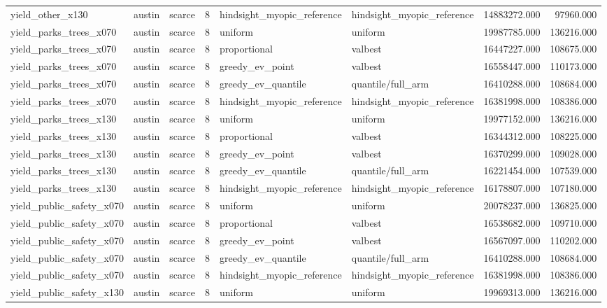 \begin{tabular}{lllrllrr}
yield\_other\_x130 & austin & scarce & 8 & hindsight\_myopic\_reference & hindsight\_myopic\_reference & 14883272.000 & 97960.000 \\
yield\_parks\_trees\_x070 & austin & scarce & 8 & uniform & uniform & 19987785.000 & 136216.000 \\
yield\_parks\_trees\_x070 & austin & scarce & 8 & proportional & valbest & 16447227.000 & 108675.000 \\
yield\_parks\_trees\_x070 & austin & scarce & 8 & greedy\_ev\_point & valbest & 16558447.000 & 110173.000 \\
yield\_parks\_trees\_x070 & austin & scarce & 8 & greedy\_ev\_quantile & quantile/full\_arm & 16410288.000 & 108684.000 \\
yield\_parks\_trees\_x070 & austin & scarce & 8 & hindsight\_myopic\_reference & hindsight\_myopic\_reference & 16381998.000 & 108386.000 \\
yield\_parks\_trees\_x130 & austin & scarce & 8 & uniform & uniform & 19977152.000 & 136216.000 \\
yield\_parks\_trees\_x130 & austin & scarce & 8 & proportional & valbest & 16344312.000 & 108225.000 \\
yield\_parks\_trees\_x130 & austin & scarce & 8 & greedy\_ev\_point & valbest & 16370299.000 & 109028.000 \\
yield\_parks\_trees\_x130 & austin & scarce & 8 & greedy\_ev\_quantile & quantile/full\_arm & 16221454.000 & 107539.000 \\
yield\_parks\_trees\_x130 & austin & scarce & 8 & hindsight\_myopic\_reference & hindsight\_myopic\_reference & 16178807.000 & 107180.000 \\
yield\_public\_safety\_x070 & austin & scarce & 8 & uniform & uniform & 20078237.000 & 136825.000 \\
yield\_public\_safety\_x070 & austin & scarce & 8 & proportional & valbest & 16538682.000 & 109710.000 \\
yield\_public\_safety\_x070 & austin & scarce & 8 & greedy\_ev\_point & valbest & 16567097.000 & 110202.000 \\
yield\_public\_safety\_x070 & austin & scarce & 8 & greedy\_ev\_quantile & quantile/full\_arm & 16410288.000 & 108684.000 \\
yield\_public\_safety\_x070 & austin & scarce & 8 & hindsight\_myopic\_reference & hindsight\_myopic\_reference & 16381998.000 & 108386.000 \\
yield\_public\_safety\_x130 & austin & scarce & 8 & uniform & uniform & 19969313.000 & 136216.000 \\

\end{tabular}
